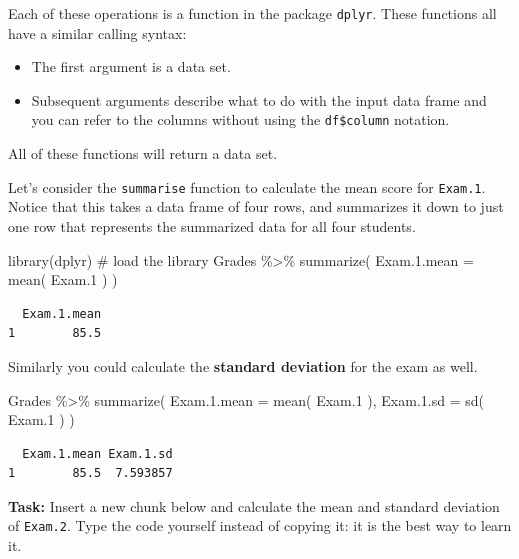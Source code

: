 \documentclass[
  letterpaper,
  DIV=11,
  numbers=noendperiod]{scrreprt}
\newenvironment{Shaded}{\begin{snugshade}}{\end{snugshade}}
\newcommand{\AttributeTok}[1]{\textcolor[rgb]{0.40,0.45,0.13}{#1}}
\newcommand{\CommentTok}[1]{\textcolor[rgb]{0.37,0.37,0.37}{#1}}
\newcommand{\FloatTok}[1]{\textcolor[rgb]{0.68,0.00,0.00}{#1}}
\newcommand{\FunctionTok}[1]{\textcolor[rgb]{0.28,0.35,0.67}{#1}}
\newcommand{\NormalTok}[1]{\textcolor[rgb]{0.00,0.23,0.31}{#1}}
\newcommand{\SpecialCharTok}[1]{\textcolor[rgb]{0.37,0.37,0.37}{#1}}
\begin{document}
Each of these operations is a function in the package \texttt{dplyr}.
These functions all have a similar calling syntax:

\begin{itemize}
\item
  The first argument is a data set.
\item
  Subsequent arguments describe what to do with the input data frame and
  you can refer to the columns without using the \texttt{df\$column}
  notation.
\end{itemize}

All of these functions will return a data set.

Let's consider the \texttt{summarise} function to calculate the mean
score for \texttt{Exam.1}. Notice that this takes a data frame of four
rows, and summarizes it down to just one row that represents the
summarized data for all four students.

\begin{Shaded}
\begin{Highlighting}[]
\FunctionTok{library}\NormalTok{(dplyr) }\CommentTok{\# load the library}
\NormalTok{Grades }\SpecialCharTok{\%\textgreater{}\%}
  \FunctionTok{summarize}\NormalTok{( }\AttributeTok{Exam.1.mean =} \FunctionTok{mean}\NormalTok{( Exam}\FloatTok{.1}\NormalTok{ ) )}
\end{Highlighting}
\end{Shaded}

\begin{verbatim}
  Exam.1.mean
1        85.5
\end{verbatim}

Similarly you could calculate the \textbf{standard deviation} for the
exam as well.

\begin{Shaded}
\begin{Highlighting}[]
\NormalTok{Grades }\SpecialCharTok{\%\textgreater{}\%}
  \FunctionTok{summarize}\NormalTok{( }\AttributeTok{Exam.1.mean =} \FunctionTok{mean}\NormalTok{( Exam}\FloatTok{.1}\NormalTok{ ),}
             \AttributeTok{Exam.1.sd   =} \FunctionTok{sd}\NormalTok{(   Exam}\FloatTok{.1}\NormalTok{   ) )}
\end{Highlighting}
\end{Shaded}

\begin{verbatim}
  Exam.1.mean Exam.1.sd
1        85.5  7.593857
\end{verbatim}

\textbf{Task:} Insert a new chunk below and calculate the mean and
standard deviation of \texttt{Exam.2}. Type the code yourself instead of
copying it: it is the best way to learn it.
\end{document}
